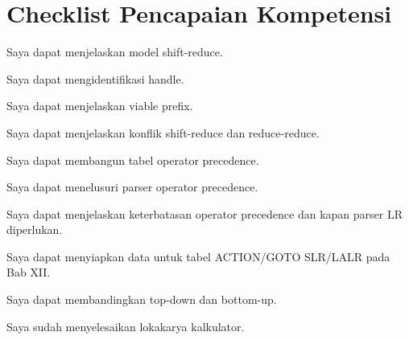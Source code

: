 \section*{Checklist Pencapaian Kompetensi}

\begin{checklist}
  \item Saya dapat menjelaskan model shift-reduce.
  \item Saya dapat mengidentifikasi handle.
  \item Saya dapat menjelaskan viable prefix.
  \item Saya dapat menjelaskan konflik shift-reduce dan
        reduce-reduce.
  \item Saya dapat membangun tabel operator precedence.
  \item Saya dapat menelusuri parser operator precedence.
  \item Saya dapat menjelaskan keterbatasan operator precedence dan
        kapan parser LR diperlukan.
  \item Saya dapat menyiapkan data untuk tabel ACTION/GOTO SLR/LALR
        pada Bab XII.
  \item Saya dapat membandingkan top-down dan bottom-up.
  \item Saya sudah menyelesaikan lokakarya kalkulator.
\end{checklist}
